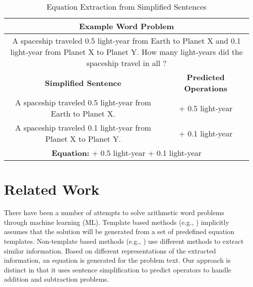 \documentclass[11pt]{article}
\begin{document}
\begin{table}[h]
\fontsize{9}{9}
\begin{tabularx}{7.9cm}{|c|c|}
\hline 
\multicolumn{2}{|c|}{\bf{Example Word Problem}} \\ \hline
\multicolumn{2}{|p{7cm}|}{\small A spaceship traveled 0.5 light-year from Earth to Planet X and 0.1 light-year from Planet X to Planet Y. How many light-years did the spaceship travel in all ?} \\ \hline
\multicolumn{1}{|m{5cm}|}{\bf \centering Simplified Sentence} & \multicolumn{1}{m{2cm}|}{\bf \centering Predicted Operations} \\ \hline
\multicolumn{1}{|m{5cm}|}{\small A spaceship traveled 0.5 light-year from Earth to Planet X.} & \multicolumn{1}{m{2cm}|}{\small \centering + 0.5 light-year} \\ \hline
\multicolumn{1}{|m{5cm}|}{\small A spaceship traveled 0.1 light-year from Planet X to Planet Y.} & \multicolumn{1}{m{2cm}|}{\small \centering + 0.1 light-year} \\ \hline
\multicolumn{2}{|m{7cm}|}{\small \centering \textbf{Equation:}  + 0.5 light-year + 0.1 light-year} \\ \hline
\end{tabularx}
\caption{\small \label{figure:1} Equation Extraction from Simplified Sentences }
\end{table}

\section{Related Work}
There have been a number of attempts to solve arithmetic word problems through machine learning (ML). Template based methods (e.g., \cite{Kushman:14}) implicitly assumes that the solution will be generated from a set of predefined equation templates.  Non-template based methods (e.g., \cite{ARIS:14,RoyT:15,RoyR:15}) use different methods to extract similar information. Based on different representations of the extracted information, an equation is generated for the problem text.  %
Our approach is distinct in that it uses sentence simplification to predict operators to handle addition and subtraction problems.
\end{document}
